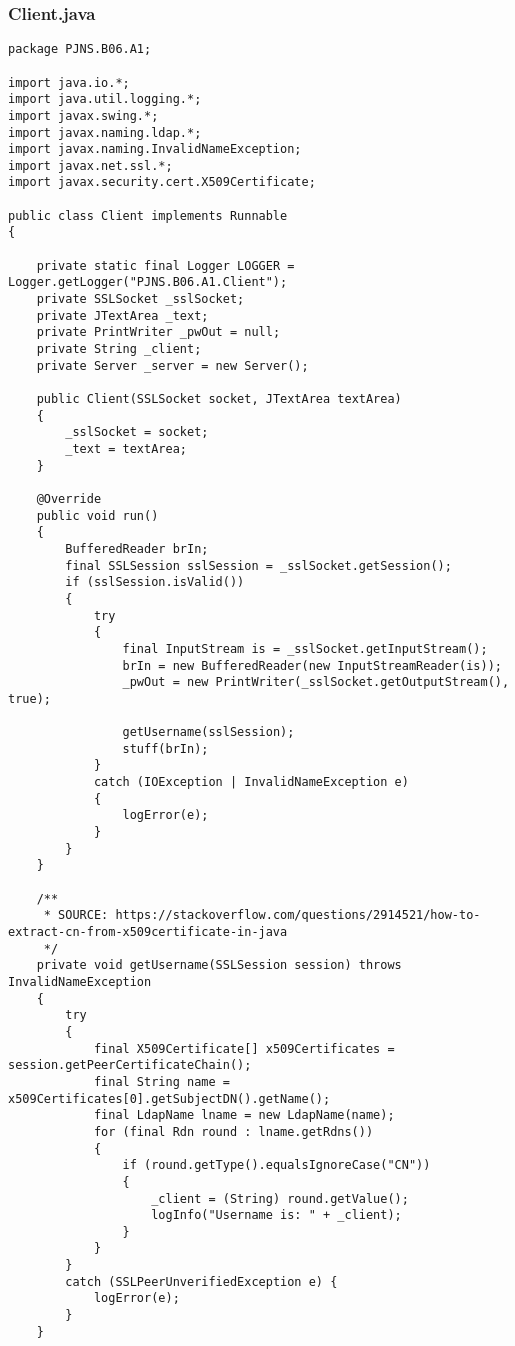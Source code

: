 \documentclass[twoside]{article}
\begin{document}
		\subsubsection*{Client.java}
		\begin{lstlisting}
package PJNS.B06.A1;

import java.io.*;
import java.util.logging.*;
import javax.swing.*;
import javax.naming.ldap.*;
import javax.naming.InvalidNameException;
import javax.net.ssl.*;
import javax.security.cert.X509Certificate;

public class Client implements Runnable
{

    private static final Logger LOGGER = Logger.getLogger("PJNS.B06.A1.Client");
    private SSLSocket _sslSocket;
    private JTextArea _text;
    private PrintWriter _pwOut = null;
    private String _client;
    private Server _server = new Server();

    public Client(SSLSocket socket, JTextArea textArea)
    {
        _sslSocket = socket;
        _text = textArea;
    }

    @Override
    public void run()
    {
        BufferedReader brIn;
        final SSLSession sslSession = _sslSocket.getSession();
        if (sslSession.isValid())
        {
            try
            {
                final InputStream is = _sslSocket.getInputStream();
                brIn = new BufferedReader(new InputStreamReader(is));
                _pwOut = new PrintWriter(_sslSocket.getOutputStream(), true);

                getUsername(sslSession);
                stuff(brIn);
            }
            catch (IOException | InvalidNameException e)
            {
                logError(e);
            }
        }
    }

    /**
     * SOURCE: https://stackoverflow.com/questions/2914521/how-to-extract-cn-from-x509certificate-in-java
     */
    private void getUsername(SSLSession session) throws InvalidNameException
    {
        try
        {
            final X509Certificate[] x509Certificates = session.getPeerCertificateChain();
            final String name = x509Certificates[0].getSubjectDN().getName();
            final LdapName lname = new LdapName(name);
            for (final Rdn round : lname.getRdns())
            {
                if (round.getType().equalsIgnoreCase("CN"))
                {
                    _client = (String) round.getValue();
                    logInfo("Username is: " + _client);
                }
            }
        }
        catch (SSLPeerUnverifiedException e) {
            logError(e);
        }
    }


\end{lstlisting}
\end{document}
